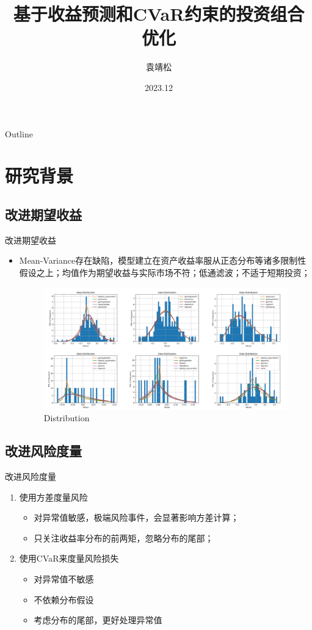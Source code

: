 \documentclass[CJK,aspectratio=43]{beamer}  %
\title[投资组合优化]{基于收益预测和CVaR约束的投资组合优化}
\author{袁靖松}
\institute{金融数学专题展示}
\date{2023.12}
\begin{document}
	\begin{frame}
		\titlepage
	\end{frame}
	\begin{frame}{Outline}
	\end{frame}
\section{研究背景}
\subsection{改进期望收益}
	\begin{frame}{改进期望收益}
			\begin{itemize}
				\item Mean-Variance存在缺陷，模型建立在资产收益率服从正态分布等诸多限制性假设之上；均值作为期望收益与实际市场不符；低通滤波；不适于短期投资；
			\begin{figure}
				\centering
				\includegraphics[width=1.04\linewidth]{"pic/distribution of random six"}
				\caption{Distribution}
				\label{fig:distribution-of-random-stock}
			\end{figure}
			\end{itemize}
	\end{frame}
\subsection{改进风险度量}
	\begin{frame}{改进风险度量}
		\begin{enumerate}
			\item 使用方差度量风险
			\begin{itemize}
				\item 对异常值敏感，极端风险事件，会显著影响方差计算；
				\item 只关注收益率分布的前两矩，忽略分布的尾部；
			\end{itemize}
			\item 使用CVaR来度量风险损失
			\begin{itemize}
				\item 对异常值不敏感
				\item 不依赖分布假设
				\item 考虑分布的尾部，更好处理异常值
			\end{itemize}
		\end{enumerate}
	\end{frame}
\end{document}
